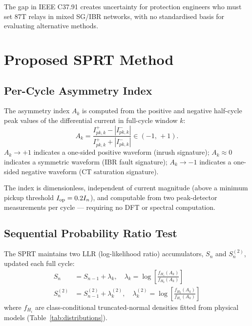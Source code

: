 \documentclass[11pt, a4paper]{article}
\begin{document}
The gap in IEEE C37.91 creates uncertainty for protection engineers who must
set 87T relays in mixed SG/IBR networks, with no standardised basis for
evaluating alternative methods.

\section{Proposed SPRT Method}

\subsection{Per-Cycle Asymmetry Index}

The asymmetry index $A_k$ is computed from the positive and negative half-cycle
peak values of the differential current in full-cycle window $k$:
\begin{equation}
  A_k = \frac{I^+_{pk,k} - |I^-_{pk,k}|}{I^+_{pk,k} + |I^-_{pk,k}|}
  \in (-1,\,+1).
  \label{eq:Ak}
\end{equation}
$A_k \to +1$ indicates a one-sided positive waveform (inrush signature);
$A_k \approx 0$ indicates a symmetric waveform (IBR fault signature);
$A_k \to -1$ indicates a one-sided negative waveform (CT saturation
signature).

The index is dimensionless, independent of current magnitude (above a
minimum pickup threshold $I_{\rm op} = 0.2I_n$), and computable from two
peak-detector measurements per cycle — requiring no DFT or spectral
computation.

\subsection{Sequential Probability Ratio Test}

The SPRT maintains two LLR (log-likelihood ratio) accumulators, $S_n$ and
$S^{(2)}_n$, updated each full cycle:
\begin{align}
  S_n    &= S_{n-1} + \lambda_k, \quad
    \lambda_k = \log\!\left[\frac{f_{H_1}(A_k)}{f_{H_0}(A_k)}\right]
    \label{eq:sprt_sn} \\
  S^{(2)}_n &= S^{(2)}_{n-1} + \lambda^{(2)}_k, \quad
    \lambda^{(2)}_k = \log\!\left[\frac{f_{H_2}(A_k)}{f_{H_1}(A_k)}\right]
    \label{eq:sprt_sn2}
\end{align}
where $f_{H_i}$ are class-conditional truncated-normal densities fitted
from physical models (Table~\ref{tab:distributions}).
\end{document}
